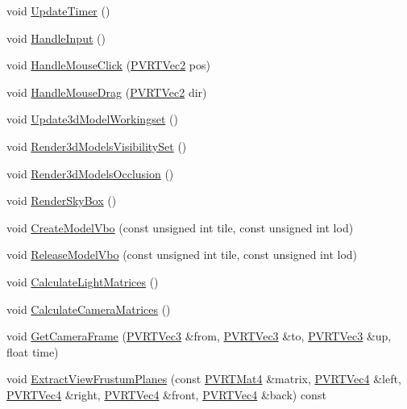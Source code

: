 \begin{DoxyCompactItemize}
\item 
void \hyperlink{class_o_g_l_e_s2_navigation3_d_aa97dace7d66a2c9106df4c9062a6d9b3}{Update\+Timer} ()
\item 
void \hyperlink{class_o_g_l_e_s2_navigation3_d_aca85aa7b6359cb7d73170ee838ac07d5}{Handle\+Input} ()
\item 
void \hyperlink{class_o_g_l_e_s2_navigation3_d_a0030f4d90c3627df6bc58b3c28a274cd}{Handle\+Mouse\+Click} (\hyperlink{struct_p_v_r_t_vec2}{P\+V\+R\+T\+Vec2} pos)
\item 
void \hyperlink{class_o_g_l_e_s2_navigation3_d_a2cdb9a3bcdd1c849aa5dcd279504c813}{Handle\+Mouse\+Drag} (\hyperlink{struct_p_v_r_t_vec2}{P\+V\+R\+T\+Vec2} dir)
\item 
void \hyperlink{class_o_g_l_e_s2_navigation3_d_a6a9cbcb7c66715671b07c368d8e711ad}{Update3d\+Model\+Workingset} ()
\item 
void \hyperlink{class_o_g_l_e_s2_navigation3_d_a1db092adebafab401f631bb02d97fb0c}{Render3d\+Models\+Visibility\+Set} ()
\item 
void \hyperlink{class_o_g_l_e_s2_navigation3_d_a7903548f34f6197d49be525b7ae0a34a}{Render3d\+Models\+Occlusion} ()
\item 
void \hyperlink{class_o_g_l_e_s2_navigation3_d_a6eff285720cccf5173b4464f929990b7}{Render\+Sky\+Box} ()
\item 
void \hyperlink{class_o_g_l_e_s2_navigation3_d_a84f56c378cc6261736fe3e38de7379ad}{Create\+Model\+Vbo} (const unsigned int tile, const unsigned int lod)
\item 
void \hyperlink{class_o_g_l_e_s2_navigation3_d_a5c70c690851d0bd321f952b4392c4164}{Release\+Model\+Vbo} (const unsigned int tile, const unsigned int lod)
\item 
void \hyperlink{class_o_g_l_e_s2_navigation3_d_aa020af54def2942c654dc393a29bf2df}{Calculate\+Light\+Matrices} ()
\item 
void \hyperlink{class_o_g_l_e_s2_navigation3_d_af4778c03d6a29279d2a279a095d21514}{Calculate\+Camera\+Matrices} ()
\item 
void \hyperlink{class_o_g_l_e_s2_navigation3_d_aa70cd0b48250be3581eb8fee4b5fe43d}{Get\+Camera\+Frame} (\hyperlink{struct_p_v_r_t_vec3}{P\+V\+R\+T\+Vec3} \&from, \hyperlink{struct_p_v_r_t_vec3}{P\+V\+R\+T\+Vec3} \&to, \hyperlink{struct_p_v_r_t_vec3}{P\+V\+R\+T\+Vec3} \&up, float time)
\item 
void \hyperlink{class_o_g_l_e_s2_navigation3_d_a918a2c109fc1f766e1e522c865f90810}{Extract\+View\+Frustum\+Planes} (const \hyperlink{struct_p_v_r_t_mat4}{P\+V\+R\+T\+Mat4} \&matrix, \hyperlink{struct_p_v_r_t_vec4}{P\+V\+R\+T\+Vec4} \&left, \hyperlink{struct_p_v_r_t_vec4}{P\+V\+R\+T\+Vec4} \&right, \hyperlink{struct_p_v_r_t_vec4}{P\+V\+R\+T\+Vec4} \&front, \hyperlink{struct_p_v_r_t_vec4}{P\+V\+R\+T\+Vec4} \&back) const 

\end{DoxyCompactItemize}
